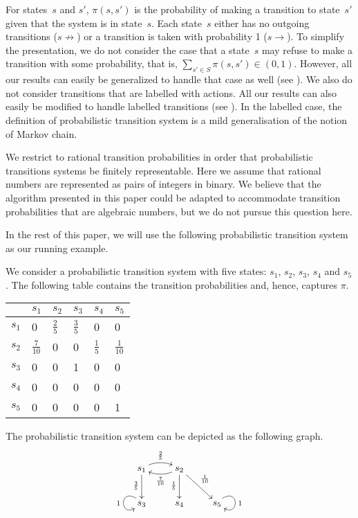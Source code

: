\documentclass{LMCS}
\begin{document}
For states~$s$ and $s'$, $\pi(s, s')$ is the probability of making a
transition to state~$s'$ given that the system is in state~$s$.
Each state~$s$ either has no outgoing transitions ($s \not\rightarrow$)
or a transition is taken with probability 1 ($s \rightarrow$).
To simplify the presentation, we do not consider the case that a 
state~$s$ may refuse to make a transition with some probability, 
that is, $\sum_{s' \in S} \pi(s, s') \in (0, 1)$.  However, all our 
results can easily be generalized to handle that case as well
(see \cite{S06:york}).  We also do not consider transitions that are 
labelled with actions.  All our results can also easily be modified to 
handle labelled transitions (see \cite{S06:york}).  In the labelled case, 
the definition of probabilistic transition system is a mild generalisation 
of the notion of Markov chain.

We restrict to rational transition probabilities in order that
probabilistic transitions systems be finitely representable.  Here we
assume that rational numbers are represented as pairs of integers in
binary. We believe that the algorithm presented in this paper could be
adapted to accommodate transition probabilities that are algebraic
numbers, but we do not pursue this question here.

In the rest of this paper, we will use the following probabilistic
transition system as our running example.

\begin{exa}
\label{example:1}
We consider a probabilistic transition system with five states:
$s_1$, $s_2$, $s_3$, $s_4$ and $s_5$.  The following table contains
the transition probabilities and, hence, captures $\pi$.
\begin{center}
\begin{tabular}{l|lllll}
      & $s_1$ & $s_2$ & $s_3$ & $s_4$ & $s_5$\\
\hline
$s_1$ & 0     & $\frac{2}{5}$ & $\frac{3}{5}$ & 0     & 0    \\
$s_2$ & $\frac{7}{10}$ & 0     & 0     & $\frac{1}{5}$ & $\frac{1}{10}$ \\
$s_3$ & 0     & 0     & 1     & 0     & 0    \\
$s_4$ & 0     & 0     & 0     & 0     & 0    \\
$s_5$ & 0     & 0     & 0     & 0     & 1    
\end{tabular}
\end{center}
The probabilistic transition system can be depicted as the following
graph.
\begin{displaymath}
\UseComputerModernTips
\xymatrix{
s_1 \ar@/^/[r]^{\frac{2}{5}} \ar[d]_{\frac{3}{5}} & s_2 \ar@/^/[l]^{\frac{7}{10}} \ar[d]_{\frac{1}{5}} \ar[dr]^{\frac{1}{10}}\\
s_3 \ar@(ul,dl)_{1} & s_4 & s_5 \ar@(ur,dr)^{1}}
\end{displaymath}
\end{exa}
\end{document}
